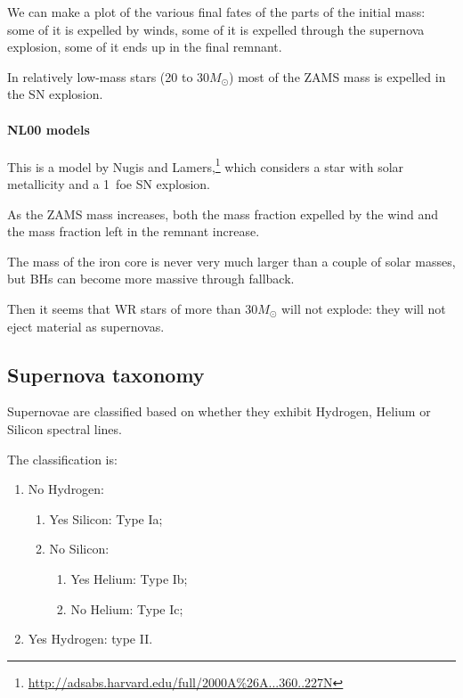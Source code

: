 \documentclass[main.tex]{subfiles}
\begin{document}
We can make a plot of the various final fates of the parts of the initial mass: some of it is expelled by winds, some of it is expelled through the supernova explosion, some of it ends up in the final remnant.

In relatively low-mass stars (20 to \(30M_{\odot}\)) most of the ZAMS mass is expelled in the SN explosion.

\paragraph{NL00 models}

This is a model by Nugis and Lamers,\footnote{\url{http://adsabs.harvard.edu/full/2000A\%26A...360..227N}}
which considers a star with solar metallicity and a \SI{1}{foe} SN explosion.

As the ZAMS mass increases, both the mass fraction expelled by the wind and the mass fraction left in the remnant increase.

The mass of the iron core is never very much larger than a couple of solar masses, but BHs can become more massive through fallback. 

Then it seems that WR stars of more than \(30 M_{\odot}\) will not explode: they will not eject material as supernovas. 





\subsection{Supernova taxonomy}

Supernovae are classified based on whether they exhibit Hydrogen, Helium or Silicon spectral lines.

The classification is: 
\begin{enumerate}
  \item No Hydrogen:
  \begin{enumerate}
    \item Yes Silicon: Type Ia;
    \item No Silicon: 
    \begin{enumerate}
      \item Yes Helium: Type Ib;
      \item No Helium: Type Ic;
    \end{enumerate}
  \end{enumerate}
  \item Yes Hydrogen: type II.
\end{enumerate}
\end{document}
